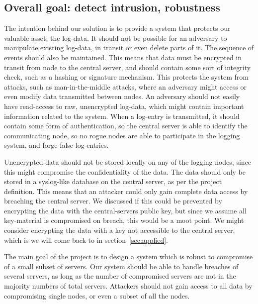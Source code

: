 \subsection{Overall goal: detect intrusion, robustness}
The intention behind our solution is to provide a system that protects
our valuable asset, the log-data. It should not be possible for an
adversary to manipulate existing log-data, in transit or even delete
parts of it. The sequence of events should also be maintained. This
means that data must be encrypted in transit from node to the central
server, and should contain some sort of integrity check, such as a
hashing or signature mechanism. This protects the system from attacks,
such as man-in-the-middle attacks, where an adversary might access or
even modify data transmitted between nodes. An adversary should not
easily have read-access to raw, unencrypted log-data, which might
contain important information related to the system. When a log-entry
is transmitted, it should contain some form of authentication, so the
central server is able to identify the communicating node, so no rogue
nodes are able to participate in the logging system, and forge false
log-entries.

Unencrypted data should not be stored locally on any of the logging
nodes, since this might compromise the confidentiality of the
data. The data should only be stored in a syslog-like database on the
central server, as per the project definition. This means that an
attacker could only gain complete data access by breaching the central
server. We discussed if this could be prevented by encrypting the data
with the central-servers public key, but since we assume all
key-material is compromised on breach, this would be a moot point. We
might consider encrypting the data with a key not accessible to the
central server, which is we will come back to in
section~\ref{sec:applied}.

The main goal of the project is to design a system which is robust to
compromise of a small subset of servers. Our system should be able to
handle breaches of several servers, as long as the number of
compromised servers are not in the majority numbers of total servers.
Attackers should not gain access to all data by compromising single
nodes, or even a subset of all the nodes.

